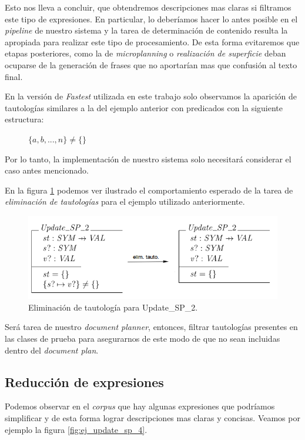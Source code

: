 Esto nos lleva a concluir, que obtendremos descripciones mas claras si filtramos este tipo de expresiones. En particular, lo deberíamos hacer lo antes posible en el \textit{pipeline} de nuestro sistema y la tarea de determinación de contenido resulta la apropiada para realizar este tipo de procesamiento. De esta forma evitaremos que etapas posteriores, como la de \emph{microplanning} o \emph{realización de superficie} deban ocuparse de la generación de frases que no aportarían mas que confusión al texto final.

En la versión de \emph{Fastest} utilizada en este trabajo solo observamos la aparición de tautologías similares a la del ejemplo anterior con predicados con la siguiente estructura:

\begin{figure}[H]
  \centering
  $\{ a, b, ... , n \} \neq \{ \}$ 
\end{figure}


Por lo tanto, la implementación de nuestro sistema solo necesitará considerar el caso antes mencionado. 

En la figura \ref{fig:ej_elim_tauto} podemos ver ilustrado el comportamiento esperado de la tarea de \emph{eliminación de tautologías} para el ejemplo utilizado anteriormente.

\begin{figure}[H]
  	\centering
	\includegraphics[scale=0.4]{img/ej_elim_tauto.png}
	\caption{Eliminación de tautología para Update\_SP\_2.}
  	\label{fig:ej_elim_tauto}
\end{figure}

Será tarea de nuestro \textit{document planner}, entonces, filtrar tautologías presentes en las clases de prueba para asegurarnos de este modo de que no sean  incluidas dentro del \emph{document plan}.

\subsection*{Reducción de expresiones}
Podemos observar en el \emph{corpus} que hay algunas expresiones que podríamos simplificar y de esta forma lograr descripciones mas claras y concisas. Veamos por ejemplo la figura \ref{fig:ej_update_sp_4}.

